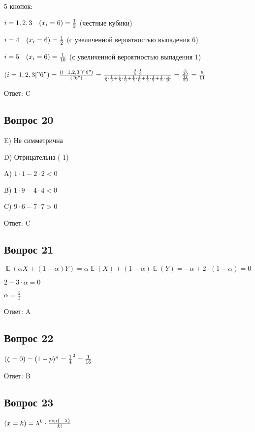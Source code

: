 \documentclass[a4paper]{article} %
\DeclareMathOperator{\E}{\mathbb{E}}
\let\P\relax
\DeclareMathOperator{\P}{\mathbb{P}}
\begin{document}
\begin{flushleft}
5 кнопок:

$i=1,2,3 \quad \P(x_i = 6) =\frac{1}{2}$ (честные кубики)

$i=4 \quad \P(x_i = 6) =\frac{1}{2}$ (с увеличенной вероятностью выпадения 6)

$i=5 \quad \P(x_i = 6) =\frac{1}{10}$ (с увеличенной вероятностью выпадения 1)

$\P(i=1,2,3| "6") = \frac{\P(i=1,2,3\cap "6")}{\P("6")} = \frac{\frac{3}{5}\cdot \frac{1}{6}}{\frac{1}{5}\cdot \frac{1}{6} + \frac{1}{5}\cdot \frac{1}{6} + \frac{1}{5}\cdot \frac{1}{6} + \frac{1}{5}\cdot \frac{1}{2} + \frac{1}{5}\cdot \frac{1}{10}} = \frac{\frac{3}{30}}{\frac{11}{50}} = \frac{5}{11} $

Ответ: C

\subsection{Вопрос 20}


E) Не симметрична

D) Отрицательна (-1)

A) $1\cdot1 - 2\cdot2 < 0$

B) $1\cdot9 - 4\cdot4 < 0$

C) $9\cdot6 - 7\cdot7 > 0$

Ответ: C

\subsection{Вопрос 21}

$\E(\alpha X + (1 - \alpha)Y) = \alpha \E(X) + (1-\alpha) \E(Y) = -\alpha + 2\cdot(1-\alpha) = 0$

$2 - 3\cdot\alpha = 0$

$\alpha = \frac{2}{3}$

Ответ: A

\subsection{Вопрос 22}

$\P(\xi = 0) = (1-p)^n = \frac{1}{4}^2 = \frac{1}{16}$

Ответ: B

\subsection{Вопрос 23}

$\P(x=k) = \lambda^k\cdot\frac{\exp{-\lambda}}{k!}$


\end{flushleft}
\end{document}
